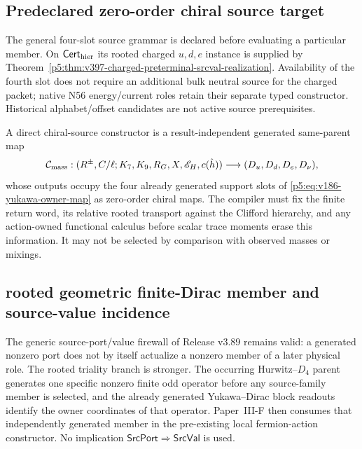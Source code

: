 \documentclass[12pt,a4paper]{article}
\begin{document}
\subsection{Predeclared zero-order chiral source target}
\label{p5:sec:v2187-predeclared-chiral-source-target}
The general four-slot source grammar is declared before evaluating a
particular member. On $\mathsf{Cert}_{\rm hier}$ its rooted charged
$u,d,e$ instance is supplied by
Theorem~\ref{p5:thm:v397-charged-preterminal-srcval-realization}.
Availability of the fourth slot does not require an additional bulk neutral
source for the charged packet; native N56 energy/current roles retain their
separate typed constructor. Historical alphabet/offset candidates are not active source prerequisites.

\begin{definition}
\label{p5:def:v369-direct-mass-compiler-target}
A direct chiral-source constructor is a result-independent generated
same-parent map
\[
 \mathcal C_{\rm mass}:
 (R^\pm,C/\ell;K_7,K_9,R_G,X,\mathscr E_H,c(\hat h))
 \longrightarrow
 (D_u,D_d,D_e,D_\nu),
\]
whose outputs occupy the four already generated support slots of
\eqref{p5:eq:v186-yukawa-owner-map} as zero-order chiral maps.  The compiler
must fix the finite return word, its relative rooted transport against the
Clifford hierarchy, and any action-owned functional calculus before scalar
trace moments erase this information.  It may not be selected by comparison
with observed masses or mixings.
\end{definition}



\subsection{rooted geometric finite-Dirac member and source-value incidence}
\label{p5:sec:v392-rooted-geometric-srcval}

The generic source-port/value firewall of Release v3.89 remains valid: a
generated nonzero port does not by itself actualize a nonzero member of a
later physical role.  The rooted triality branch is stronger.  The occurring
Hurwitz--$D_4$ parent generates one specific nonzero finite odd operator before
any source-family member is selected, and the already generated
Yukawa--Dirac block readouts identify the owner coordinates of that operator.
Paper~III-F then consumes that independently generated member in the
pre-existing local fermion-action constructor.  No implication
$\mathsf{SrcPort}\Rightarrow\mathsf{SrcVal}$ is used.
\end{document}
